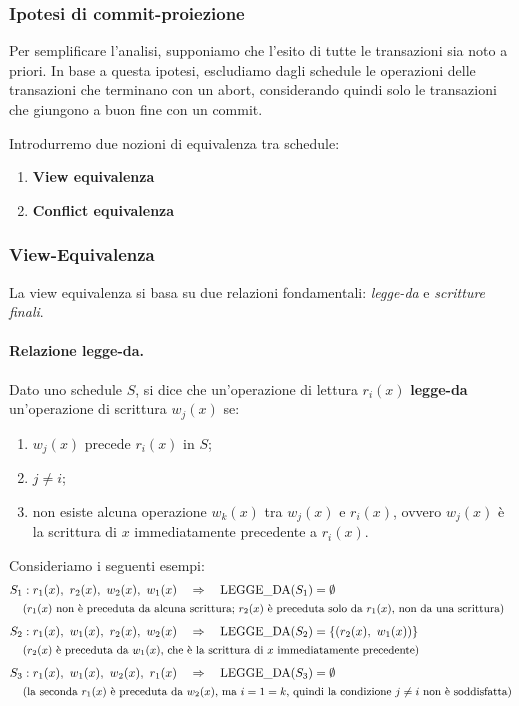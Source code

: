 \subsubsection{Ipotesi di commit-proiezione}

Per semplificare l'analisi, supponiamo che l'esito di tutte le transazioni sia noto a priori. In base a questa ipotesi, escludiamo dagli schedule le operazioni delle transazioni che terminano con un abort, considerando quindi solo le transazioni che giungono a buon fine con un commit.

Introdurremo due nozioni di equivalenza tra schedule:
\begin{enumerate}
	\item \textbf{View equivalenza}
	\item \textbf{Conflict equivalenza}
\end{enumerate}
\subsubsection{View-Equivalenza}

La view equivalenza si basa su due relazioni fondamentali: \textit{legge-da} e \textit{scritture finali}.

\paragraph{Relazione legge-da.}
Dato uno schedule $S$, si dice che un'operazione di lettura $r_i(x)$ \textbf{legge-da} un'operazione di scrittura $w_j(x)$ se:
\begin{enumerate}
	\item $w_j(x)$ precede $r_i(x)$ in $S$;
	\item $j \neq i$;
	\item non esiste alcuna operazione $w_k(x)$ tra $w_j(x)$ e $r_i(x)$, ovvero $w_j(x)$ è la scrittura di $x$ immediatamente precedente a $r_i(x)$.
\end{enumerate}

Consideriamo i seguenti esempi:
\begin{align*}
	S_1 &: r_1(x),\ r_2(x),\ w_2(x),\ w_1(x) \quad \Rightarrow \quad \text{LEGGE\_DA}(S_1) = \emptyset \\
	& \text{\small($r_1(x)$ non è preceduta da alcuna scrittura; $r_2(x)$ è preceduta solo da $r_1(x)$, non da una scrittura)} \\[4pt]
	S_2 &: r_1(x),\ w_1(x),\ r_2(x),\ w_2(x) \quad \Rightarrow \quad \text{LEGGE\_DA}(S_2) = \{(r_2(x),\ w_1(x))\} \\
	& \text{\small($r_2(x)$ è preceduta da $w_1(x)$, che è la scrittura di $x$ immediatamente precedente)} \\[4pt]
	S_3 &: r_1(x),\ w_1(x),\ w_2(x),\ r_1(x) \quad \Rightarrow \quad \text{LEGGE\_DA}(S_3) = \emptyset \\
	& \text{\small(la seconda $r_1(x)$ è preceduta da $w_2(x)$, ma $i = 1 = k$, quindi la condizione $j \neq i$ non è soddisfatta)}
\end{align*}


